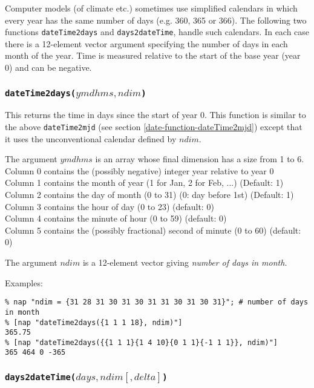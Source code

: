 Computer models (of climate etc.) sometimes use simplified
      calendars in which every year has the same number of days (e.g.
      360, 365 or 366). The following two functions 
      \texttt{dateTime2days} and 
      \texttt{days2dateTime}, handle such calendars. In each case
      there is a 12-element vector argument specifying the number of
      days in each month of the year. Time is measured relative to the
      start of the base year (year 0) and can be negative.

\subsubsection{\texttt{dateTime2days(}$ymdhms, ndim$\texttt{)}}
        \label{date-function-dateTime2days} 

This returns the time in days since the start of year 0.
This function is similar to the above 
\texttt{dateTime2mjd}
(see section \ref{date-function-dateTime2mjd})
except that it uses the unconventional calendar defined by $ndim$.

The argument 
      $ymdhms$ is an array whose final dimension has a size
      from 1 to 6.
      \\Column 0 contains the (possibly negative) integer year
      relative to year 0
      \\Column 1 contains the month of year (1 for Jan, 2 for Feb,
      ...) (Default: 1)
      \\Column 2 contains the day of month (0 to 31) (0: day before
      1st) (Default: 1)
      \\Column 3 contains the hour of day (0 to 23) (default: 0)
      \\Column 4 contains the minute of hour (0 to 59) (default: 0)
      \\Column 5 contains the (possibly fractional) second of
      minute (0 to 60) (default: 0)
      

The argument 
      $ndim$ is a 12-element vector giving 
      \emph{number of days in month}.
      

Examples:
      \begin{verbatim}
% nap "ndim = {31 28 31 30 31 30 31 31 30 31 30 31}"; # number of days in month
% [nap "dateTime2days({1 1 1 18}, ndim)"]
365.75
% [nap "dateTime2days({{1 1 1}{1 4 10}{0 1 1}{-1 1 1}}, ndim)"]
365 464 0 -365
\end{verbatim}

\subsubsection{\texttt{days2dateTime(}$days, ndim[, delta]$\texttt{)}}
    \label{date-function-days2dateTime}


